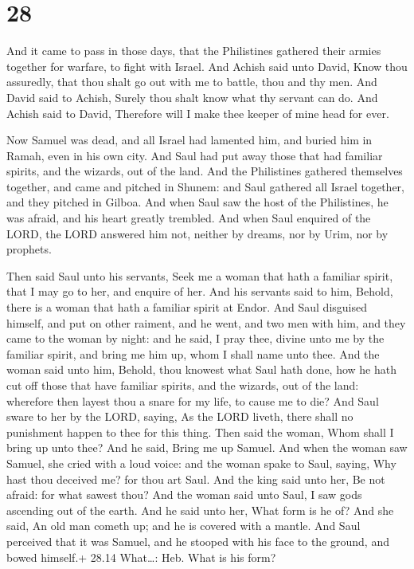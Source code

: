 \hypertarget{section-27}{%
\section{28}\label{section-27}}

 And it came to pass in those days, that the Philistines
gathered their armies together for warfare, to fight with Israel. And
Achish said unto David, Know thou assuredly, that thou shalt go out with
me to battle, thou and thy men.  And David said to Achish,
Surely thou shalt know what thy servant can do. And Achish said to
David, Therefore will I make thee keeper of mine head for ever.

 Now Samuel was dead, and all Israel had lamented him, and
buried him in Ramah, even in his own city. And Saul had put away those
that had familiar spirits, and the wizards, out of the land.
 And the Philistines gathered themselves together, and came
and pitched in Shunem: and Saul gathered all Israel together, and they
pitched in Gilboa.  And when Saul saw the host of the
Philistines, he was afraid, and his heart greatly trembled. 
And when Saul enquired of the LORD, the LORD answered him not, neither
by dreams, nor by Urim, nor by prophets.

 Then said Saul unto his servants, Seek me a woman that
hath a familiar spirit, that I may go to her, and enquire of her. And
his servants said to him, Behold, there is a woman that hath a familiar
spirit at Endor.  And Saul disguised himself, and put on
other raiment, and he went, and two men with him, and they came to the
woman by night: and he said, I pray thee, divine unto me by the familiar
spirit, and bring me him up, whom I shall name unto thee. 
And the woman said unto him, Behold, thou knowest what Saul hath done,
how he hath cut off those that have familiar spirits, and the wizards,
out of the land: wherefore then layest thou a snare for my life, to
cause me to die?  And Saul sware to her by the LORD,
saying, As the LORD liveth, there shall no punishment happen to thee for
this thing.  Then said the woman, Whom shall I bring up
unto thee? And he said, Bring me up Samuel.  And when the
woman saw Samuel, she cried with a loud voice: and the woman spake to
Saul, saying, Why hast thou deceived me? for thou art Saul.
 And the king said unto her, Be not afraid: for what sawest
thou? And the woman said unto Saul, I saw gods ascending out of the
earth.  And he said unto her, What form is he of? And she
said, An old man cometh up; and he is covered with a mantle. And Saul
perceived that it was Samuel, and he stooped with his face to the
ground, and bowed himself.+ 28.14 What\ldots: Heb. What is his form?

